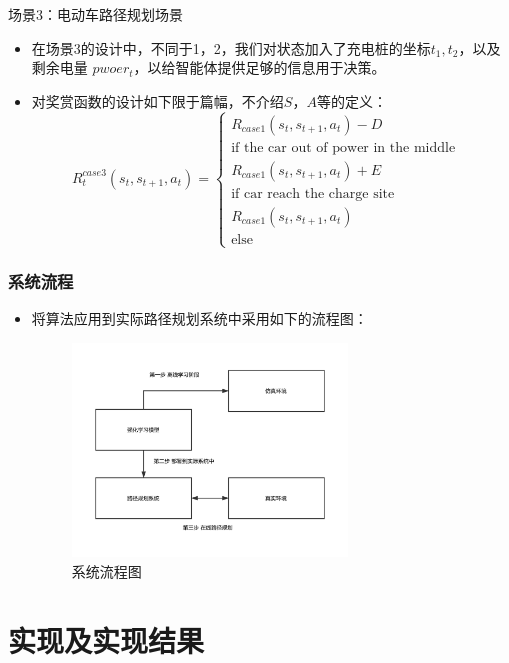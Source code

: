 \documentclass{beamer}
\begin{document}
\begin{frame}{场景3：电动车路径规划场景}
\begin{itemize}
    \item 在场景3的设计中，不同于1，2，我们对状态加入了充电桩的坐标$t_1, t_2$，以及剩余电量 $pwoer_t$，以给智能体提供足够的信息用于决策。
    \item 对奖赏函数的设计如下{限于篇幅，不介绍$S$，$A$等的定义}：
        \begin{equation}
        \label{eq3reward}
        R_t^{case3}(s_t, s_{t+1}, a_t) = \begin{cases}
         R_{case1}(s_t, s_{t+1}, a_t) - D &\\ \mbox{if the car out of power in the middle}\\
         R_{case1}(s_t, s_{t+1}, a_t) + E& \\ \mbox{if car reach the charge site}\\
         R_{case1}(s_t, s_{t+1}, a_t)&\\ \mbox{else}
        \end{cases}
    \end{equation}
\end{itemize}
\end{frame}
\begin{frame}
\frametitle{系统流程} %
\begin{itemize}
    \item 将算法应用到实际路径规划系统中采用如下的流程图：
    \begin{figure}
        \centering
        \includegraphics[width=7.3cm]{pic/sysmte.pdf}
        \caption{系统流程图}
        \label{fig: system}
    \end{figure}
\end{itemize}
\end{frame}


\section{实现及实现结果}
\end{document}
